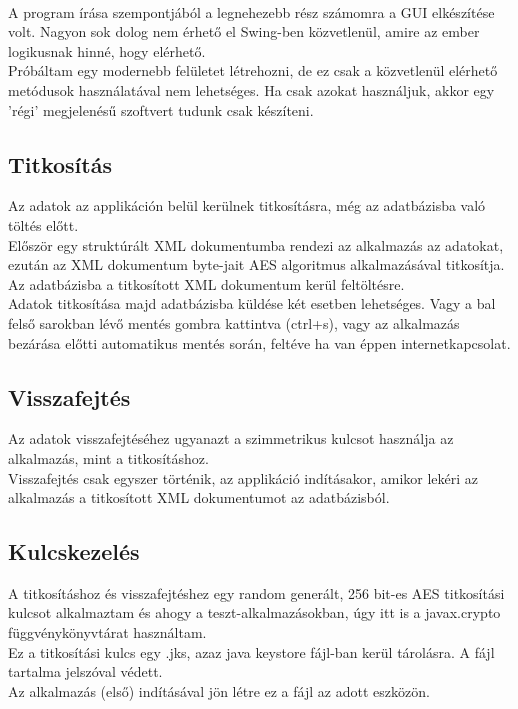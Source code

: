 \vspace{10pt}\noindent \\ A program írása szempontjából a legnehezebb rész számomra a GUI elkészítése volt. Nagyon sok dolog nem érhető el Swing-ben közvetlenül, amire az ember logikusnak hinné, hogy elérhető.
\\Próbáltam egy modernebb felületet létrehozni, de ez csak a közvetlenül elérhető metódusok használatával nem lehetséges. Ha csak azokat használjuk, akkor egy 'régi' megjelenésű szoftvert tudunk csak készíteni.

\subsection{Titkosítás}

Az adatok az applikáción belül kerülnek titkosításra, még az adatbázisba való töltés előtt.
\vspace{5pt} \\ Először egy struktúrált XML dokumentumba rendezi az alkalmazás az adatokat, ezután az XML dokumentum byte-jait AES algoritmus alkalmazásával titkosítja. 
\vspace{5pt} \\ Az adatbázisba a titkosított XML dokumentum kerül feltöltésre.
\vspace{15pt} \\Adatok titkosítása majd adatbázisba küldése két esetben lehetséges. Vagy a bal felső sarokban lévő mentés gombra kattintva (ctrl+s), vagy az alkalmazás bezárása előtti automatikus mentés során, feltéve ha van éppen internetkapcsolat.

\subsection{Visszafejtés}
Az adatok visszafejtéséhez ugyanazt a szimmetrikus kulcsot használja az alkalmazás, mint a titkosításhoz.
\vspace{5pt} \\ Visszafejtés csak egyszer történik, az applikáció indításakor, amikor lekéri az alkalmazás a titkosított XML dokumentumot az adatbázisból.


\subsection{Kulcskezelés}
A titkosításhoz és visszafejtéshez egy random generált, 256 bit-es AES titkosítási kulcsot alkalmaztam és ahogy a teszt-alkalmazásokban, úgy itt is a javax.crypto függvénykönyvtárat használtam.
\vspace{5pt} \\ Ez a titkosítási kulcs egy .jks, azaz java keystore fájl-ban kerül tárolásra. A fájl tartalma jelszóval védett.
\\Az alkalmazás (első) indításával jön létre ez a fájl az adott eszközön.



